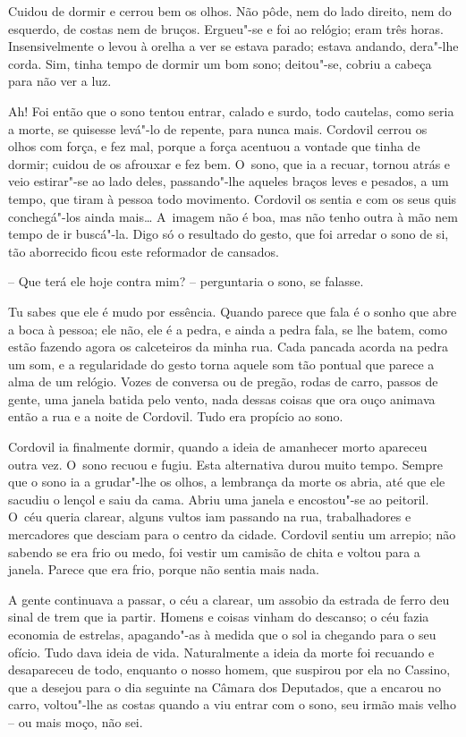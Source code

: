 Cuidou de dormir e cerrou bem os olhos. Não pôde, nem do lado direito,
nem do esquerdo, de costas nem de bruços. Ergueu"-se e foi ao relógio;
eram três horas. Insensivelmente o levou à orelha a ver se estava
parado; estava andando, dera"-lhe corda. Sim, tinha tempo de dormir um
bom sono; deitou"-se, cobriu a cabeça para não ver a luz.

Ah! Foi então que o sono tentou entrar, calado e surdo, todo cautelas,
como seria a morte, se quisesse levá"-lo de repente, para nunca mais.
Cordovil cerrou os olhos com força, e fez mal, porque a força acentuou a
vontade que tinha de dormir; cuidou de os afrouxar e fez bem. O~sono,
que ia a recuar, tornou atrás e veio estirar"-se ao lado deles,
passando"-lhe aqueles braços leves e pesados, a um tempo, que tiram à
pessoa todo movimento. Cordovil os sentia e com os seus quis
conchegá"-los ainda mais\ldots{} A~imagem não é boa, mas não tenho outra à mão
nem tempo de ir buscá"-la. Digo só o resultado do gesto, que foi arredar
o sono de si, tão aborrecido ficou este reformador de cansados.

-- Que terá ele hoje contra mim? -- perguntaria o sono, se falasse.

Tu sabes que ele é mudo por essência. Quando parece que fala é o sonho
que abre a boca à pessoa; ele não, ele é a pedra, e ainda a pedra fala,
se lhe batem, como estão fazendo agora os calceteiros da minha rua. Cada
pancada acorda na pedra um som, e a regularidade do gesto torna aquele
som tão pontual que parece a alma de um relógio. Vozes de conversa ou de
pregão, rodas de carro, passos de gente, uma janela batida pelo vento,
nada dessas coisas que ora ouço animava então a rua e a noite de
Cordovil. Tudo era propício ao sono.

Cordovil ia finalmente dormir, quando a ideia de amanhecer morto
apareceu outra vez. O~sono recuou e fugiu. Esta alternativa durou muito
tempo. Sempre que o sono ia a grudar"-lhe os olhos, a lembrança da morte
os abria, até que ele sacudiu o lençol e saiu da cama. Abriu uma janela
e encostou"-se ao peitoril. O~céu queria clarear, alguns vultos iam
passando na rua, trabalhadores e mercadores que desciam para o centro da
cidade. Cordovil sentiu um arrepio; não sabendo se era frio ou medo, foi
vestir um camisão de chita e voltou para a janela. Parece que era frio,
porque não sentia mais nada.

A gente continuava a passar, o céu a clarear, um assobio da estrada de
ferro deu sinal de trem que ia partir. Homens e coisas vinham do
descanso; o céu fazia economia de estrelas, apagando"-as à medida que o
sol ia chegando para o seu ofício. Tudo dava ideia de vida. Naturalmente
a ideia da morte foi recuando e desapareceu de todo, enquanto o nosso
homem, que suspirou por ela no Cassino, que a desejou para o dia
seguinte na Câmara dos Deputados, que a encarou no carro, voltou"-lhe as
costas quando a viu entrar com o sono, seu irmão mais velho -- ou mais
moço, não sei.

